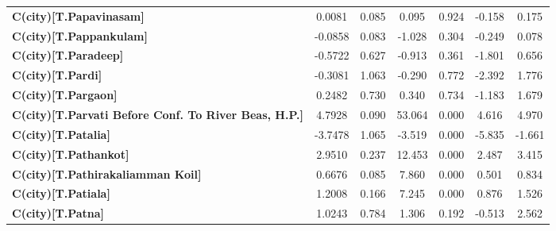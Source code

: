 \begin{center}
\begin{tabular}{lcccccc}
\textbf{C(city)[T.Papavinasam]}                                                                     &       0.0081  &        0.085     &     0.095  &         0.924        &       -0.158    &        0.175     \\
\textbf{C(city)[T.Pappankulam]}                                                                     &      -0.0858  &        0.083     &    -1.028  &         0.304        &       -0.249    &        0.078     \\
\textbf{C(city)[T.Paradeep]}                                                                        &      -0.5722  &        0.627     &    -0.913  &         0.361        &       -1.801    &        0.656     \\
\textbf{C(city)[T.Pardi]}                                                                           &      -0.3081  &        1.063     &    -0.290  &         0.772        &       -2.392    &        1.776     \\
\textbf{C(city)[T.Pargaon]}                                                                         &       0.2482  &        0.730     &     0.340  &         0.734        &       -1.183    &        1.679     \\
\textbf{C(city)[T.Parvati Before Conf. To River Beas, H.P.]}                                        &       4.7928  &        0.090     &    53.064  &         0.000        &        4.616    &        4.970     \\
\textbf{C(city)[T.Patalia]}                                                                         &      -3.7478  &        1.065     &    -3.519  &         0.000        &       -5.835    &       -1.661     \\
\textbf{C(city)[T.Pathankot]}                                                                       &       2.9510  &        0.237     &    12.453  &         0.000        &        2.487    &        3.415     \\
\textbf{C(city)[T.Pathirakaliamman Koil]}                                                           &       0.6676  &        0.085     &     7.860  &         0.000        &        0.501    &        0.834     \\
\textbf{C(city)[T.Patiala]}                                                                         &       1.2008  &        0.166     &     7.245  &         0.000        &        0.876    &        1.526     \\
\textbf{C(city)[T.Patna]}                                                                           &       1.0243  &        0.784     &     1.306  &         0.192        &       -0.513    &        2.562     \\

\end{tabular}
\end{center}
